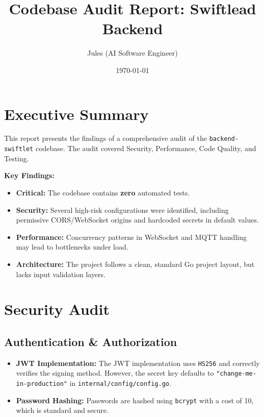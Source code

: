 \documentclass{article}
\title{Codebase Audit Report: Swiftlead Backend}
\author{Jules (AI Software Engineer)}
\date{\today}
\begin{document}
\maketitle

\section{Executive Summary}

This report presents the findings of a comprehensive audit of the \texttt{backend-swiftlet} codebase. The audit covered Security, Performance, Code Quality, and Testing.

\textbf{Key Findings:}
\begin{itemize}
    \item \textbf{Critical:} The codebase contains \textbf{zero} automated tests.
    \item \textbf{Security:} Several high-risk configurations were identified, including permissive CORS/WebSocket origins and hardcoded secrets in default values.
    \item \textbf{Performance:} Concurrency patterns in WebSocket and MQTT handling may lead to bottlenecks under load.
    \item \textbf{Architecture:} The project follows a clean, standard Go project layout, but lacks input validation layers.
\end{itemize}

\section{Security Audit}

\subsection{Authentication \& Authorization}
\begin{itemize}
    \item \textbf{JWT Implementation:} The JWT implementation uses \texttt{HS256} and correctly verifies the signing method. However, the secret key defaults to \texttt{"change-me-in-production"} in \texttt{internal/config/config.go}.
    \item \textbf{Password Hashing:} Passwords are hashed using \texttt{bcrypt} with a cost of 10, which is standard and secure.
\end{itemize}
\end{document}
